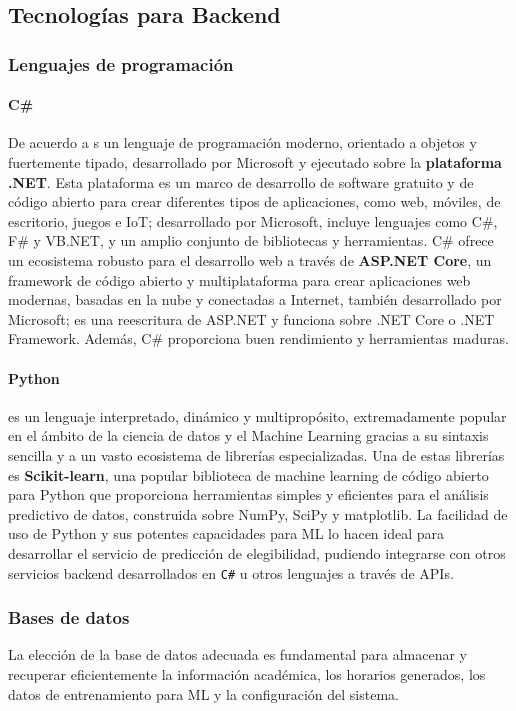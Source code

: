 \subsection{Tecnologías para Backend}
\subsubsection{Lenguajes de programación}

\paragraph{C\#}
De acuerdo a \parencite{MicrosoftCSharp} s un lenguaje de programación moderno, orientado a objetos y fuertemente tipado, desarrollado por Microsoft y ejecutado sobre la \textbf{plataforma .NET}.
Esta plataforma es un marco de desarrollo de software gratuito y de código abierto para crear diferentes tipos de aplicaciones, como web, móviles, de escritorio, juegos e IoT; desarrollado por Microsoft, incluye lenguajes como C\#, F\# y VB.NET, y un amplio conjunto de bibliotecas y herramientas.
C\# ofrece un ecosistema robusto para el desarrollo web a través de \textbf{ASP.NET Core}, un framework de código abierto y multiplataforma para crear aplicaciones web modernas, basadas en la nube y conectadas a Internet, también desarrollado por Microsoft; es una reescritura de ASP.NET y funciona sobre .NET Core o .NET Framework.
Además, C\# proporciona buen rendimiento y herramientas maduras.

\paragraph{Python}
es un lenguaje interpretado, dinámico y multipropósito, extremadamente popular en el ámbito de la ciencia de datos y el Machine Learning gracias a su sintaxis sencilla y a un vasto ecosistema de librerías especializadas.
Una de estas librerías es \textbf{Scikit-learn}, una popular biblioteca de machine learning de código abierto para Python que proporciona herramientas simples y eficientes para el análisis predictivo de datos, construida sobre NumPy, SciPy y matplotlib.
La facilidad de uso de Python y sus potentes capacidades para ML lo hacen ideal para desarrollar el servicio de predicción de elegibilidad, pudiendo integrarse con otros servicios backend desarrollados en \texttt{C\#} u otros lenguajes a través de APIs.

\subsubsection{Bases de datos}
La elección de la base de datos adecuada es fundamental para almacenar y recuperar eficientemente la información académica, los horarios generados, los datos de entrenamiento para ML y la configuración del sistema.

